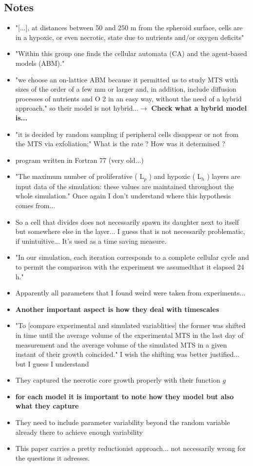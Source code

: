 \documentclass[11pt,a4paper]{article}
\begin{document}
\subsection*{Notes}
\begin{itemize}
\item "[...], at distances between 50 and 250 \textmu m from the spheroid surface, cells are in a hypoxic, or even necrotic, state due to nutrients and/or oxygen deficits"
\item "Within this group one finds the cellular automata (CA) and the agent-based models (ABM)."
\item "we choose an on-lattice ABM because it permitted us to study MTS with sizes of the order of a few mm or larger and, in addition, include diffusion processes of nutrients and O 2 in an easy way, without the need of
a hybrid approach." so their model is not hybrid...$\rightarrow$ \textbf{Check what a hybrid model is...}
\item "it is decided by random sampling if peripheral cells disappear or not from the MTS via exfoliation;" What is the rate ?  How was it determined ?
\item program written in Fortran 77 (very old...)
\item "The maximum number of proliferative ( L$_p$ ) and hypoxic ( L$_h$ ) layers are input data of the simulation: these values are maintained throughout the whole simulation." Once again I don't understand where this hypothesis comes from...
\item So a cell that divides does not necessarily spawn its daughter next to itself but somewhere else in the layer... I guess that is not necessarily problematic, if unintuitive... It's used as a time saving measure.
\item "In our simulation, each iteration corresponds to a complete cellular cycle and to permit the comparison with the experiment we assumedthat it elapsed 24 h."
\item Apparently all parameters that  I found weird were taken from experiments...
\item \textbf{Another important aspect is how they deal with timescales}
\item "To [compare experimental and simulated variablities] the former was shifted in time until the average volume of the experimental MTS in the last day of measurement and the average volume of the simulated MTS in a given instant of their growth coincided." I wish the shifting was better justified... but I guess I understand
\item They captured the necrotic core growth properly with their function $g$
\item \textbf{for each model it is important to note how they model but also what they capture}
\item They need to include parameter variability beyond the random variable already there to achieve enough variability
\item This paper carries a pretty reductionist approach... not necessarily wrong for the questions it adresses.
\end{itemize}
\end{document}
